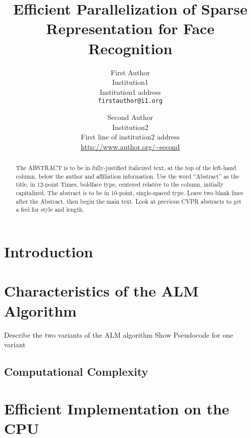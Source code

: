 \documentclass[10pt,twocolumn,letterpaper]{article}
\begin{document}
\title{Efficient Parallelization of Sparse Representation for Face Recognition}

\author{First Author\\
Institution1\\
Institution1 address\\
{\tt\small firstauthor@i1.org}
\and
Second Author\\
Institution2\\
First line of institution2 address\\
{\small\url{http://www.author.org/~second}}
}

\maketitle

\begin{abstract}
   The ABSTRACT is to be in fully-justified italicized text, at the top
   of the left-hand column, below the author and affiliation
   information. Use the word ``Abstract'' as the title, in 12-point
   Times, boldface type, centered relative to the column, initially
   capitalized. The abstract is to be in 10-point, single-spaced type.
   Leave two blank lines after the Abstract, then begin the main text.
   Look at previous CVPR abstracts to get a feel for style and length.
\end{abstract}

\section{Introduction}

\section{Characteristics of the ALM Algorithm}
Describe the two variants of the ALM algorithm
Show Pseudocode for one variant
\subsection{Computational Complexity}


\section{Efficient Implementation on the CPU}
\end{document}
